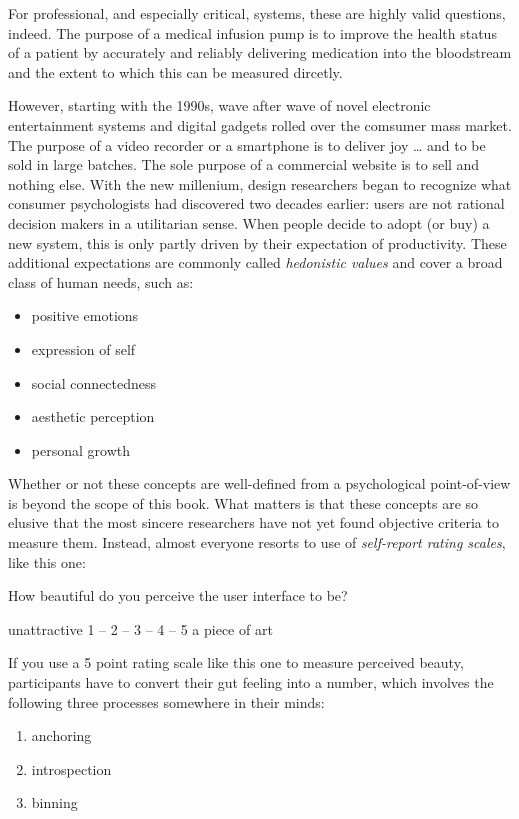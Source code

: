 \documentclass[]{svmono}
\providecommand{\tightlist}{%
  \setlength{\itemsep}{0pt}\setlength{\parskip}{0pt}}
\begin{document}
For professional, and especially critical, systems, these are highly
valid questions, indeed. The purpose of a medical infusion pump is to
improve the health status of a patient by accurately and reliably
delivering medication into the bloodstream and the extent to which this
can be measured dircetly.

However, starting with the 1990s, wave after wave of novel electronic
entertainment systems and digital gadgets rolled over the comsumer mass
market. The purpose of a video recorder or a smartphone is to deliver
joy \ldots{} and to be sold in large batches. The sole purpose of a
commercial website is to sell and nothing else. With the new millenium,
design researchers began to recognize what consumer psychologists had
discovered two decades earlier: users are not rational decision makers
in a utilitarian sense. When people decide to adopt (or buy) a new
system, this is only partly driven by their expectation of productivity.
These additional expectations are commonly called \emph{hedonistic
values} and cover a broad class of human needs, such as:

\begin{itemize}
\tightlist
\item
  positive emotions
\item
  expression of self
\item
  social connectedness
\item
  aesthetic perception
\item
  personal growth
\end{itemize}

Whether or not these concepts are well-defined from a psychological
point-of-view is beyond the scope of this book. What matters is that
these concepts are so elusive that the most sincere researchers have not
yet found objective criteria to measure them. Instead, almost everyone
resorts to use of \emph{self-report rating scales}, like this one:

How beautiful do you perceive the user interface to be?

unattractive 1 -- 2 -- 3 -- 4 -- 5 a piece of art

If you use a 5 point rating scale like this one to measure perceived
beauty, participants have to convert their gut feeling into a number,
which involves the following three processes somewhere in their minds:

\begin{enumerate}
\def\labelenumi{\arabic{enumi}.}
\tightlist
\item
  anchoring
\item
  introspection
\item
  binning
\end{enumerate}
\end{document}
